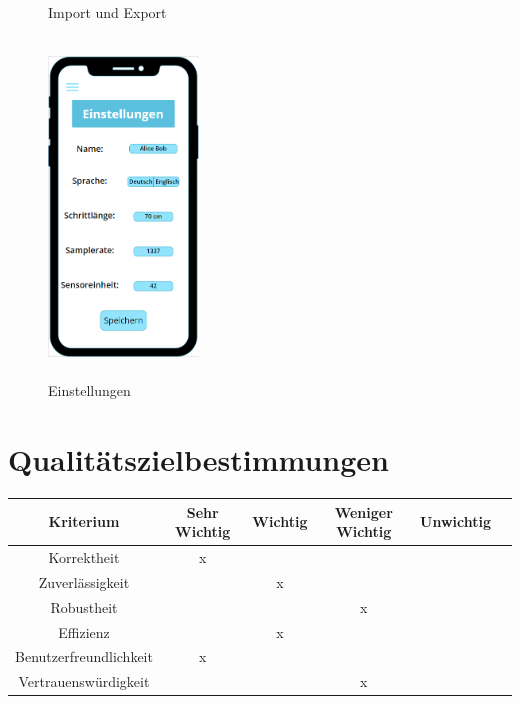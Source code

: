 \documentclass[a4paper,12pt]{article}
\begin{document}
\begin{figure}[ht!]
\begin{minipage}{0.4\textwidth}
		\caption{Import und Export}
	\end{minipage}
	\hfill
	\begin{minipage}{0.4\textwidth}
		\includegraphics[width=4cm,height=9cm]{./Benutzeroberflaeche/Settings.png}
		\caption{Einstellungen}
	\end{minipage}
\end{figure}
\newpage
\clearpage

\section{Qualitätszielbestimmungen}
\begin{tabular}[t]{|c|c|c|c|c|c|}
  \hline
  \textbf{Kriterium} & \textbf{Sehr Wichtig} & \textbf{Wichtig} & \textbf{Weniger Wichtig} & \textbf{Unwichtig}\\
  \hline
  \hline
  Korrektheit & x & & &\\ %
  \hline
  Zuverlässigkeit & & x & &\\ %
  \hline
  Robustheit & & & x &\\  %
  \hline
  Effizienz & & x & &\\ %
  \hline
  Benutzerfreundlichkeit & x & & &\\ %
  \hline
  Vertrauenswürdigkeit & & & x &\\ %
  \hline

\end{tabular}

\end{document}
